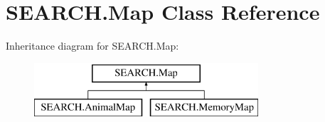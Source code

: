 \hypertarget{class_s_e_a_r_c_h_1_1_map}{\section{S\-E\-A\-R\-C\-H.\-Map Class Reference}
\label{class_s_e_a_r_c_h_1_1_map}
}
Inheritance diagram for S\-E\-A\-R\-C\-H.\-Map\-:\begin{figure}[H]
\begin{center}
\leavevmode
\includegraphics[height=2.000000cm]{class_s_e_a_r_c_h_1_1_map}
\end{center}
\end{figure}
